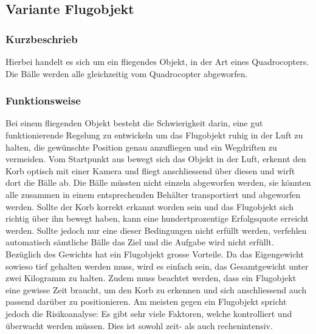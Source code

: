 

\clearpage

\subsection{Variante Flugobjekt}
\subsubsection{Kurzbeschrieb}
Hierbei handelt es sich um ein fliegendes Objekt, in der Art eines Quadrocopters. Die Bälle werden alle gleichzeitig vom Quadrocopter abgeworfen.

\subsubsection{Funktionsweise}
Bei einem fliegenden Objekt besteht die Schwierigkeit darin, eine gut funktionierende Regelung zu entwickeln um das 
Flugobjekt ruhig in der Luft zu halten, die gewünschte Position genau 
anzufliegen und ein Wegdriften zu vermeiden. 
Vom Startpunkt aus bewegt sich das Objekt in der Luft, erkennt den Korb optisch 
mit einer Kamera und fliegt anschliessend über diesen und wirft dort die Bälle 
ab. Die Bälle müssten nicht einzeln abgeworfen werden, sie könnten alle zusammen 
in einem entsprechenden Behälter transportiert und abgeworfen 
werden. Sollte der Korb korrekt erkannt worden sein und das Flugobjekt sich 
richtig über ihn bewegt haben, kann eine hundertprozentige Erfolgsquote 
erreicht werden. Sollte jedoch nur eine dieser Bedingungen nicht erfüllt werden, verfehlen  
automatisch sämtliche Bälle das Ziel und die Aufgabe wird nicht erfüllt. 
Bezüglich des Gewichts hat ein Flugobjekt grosse Vorteile. Da das Eigengewicht 
sowieso tief gehalten werden muss, wird es einfach sein, das Gesamtgewicht 
unter zwei Kilogramm zu halten.
%
Zudem muss beachtet werden, dass ein Flugobjekt eine gewisse Zeit 
braucht, um den Korb zu erkennen und sich anschliessend auch passend darüber 
zu positionieren. Am meisten gegen ein Flugobjekt spricht jedoch die 
Risikoanalyse: Es gibt sehr viele Faktoren, welche kontrolliert und überwacht 
werden müssen. Dies ist sowohl zeit- als auch rechenintensiv. 


